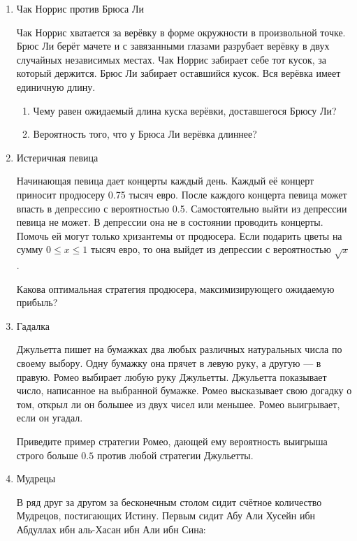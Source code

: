 \documentclass[12pt, a4paper]{article}\usepackage[]{graphicx}\usepackage[]{color}
\begin{document}
\begin{enumerate}

\item Чак Норрис против Брюса Ли

Чак Норрис хватается за верёвку в форме окружности в произвольной точке. Брюс Ли берёт мачете и с завязанными глазами разрубает верёвку в двух случайных независимых местах. Чак Норрис забирает себе тот кусок, за который держится. Брюс Ли забирает оставшийся кусок.  Вся верёвка имеет единичную длину.
\begin{enumerate}
\item Чему равен ожидаемый длина куска верёвки, доставшегося Брюсу Ли?
\item  Вероятность того, что у Брюса Ли верёвка длиннее?
\end{enumerate}

\item Истеричная певица

Начинающая певица дает концерты каждый день. Каждый её концерт приносит продюсеру 0.75 тысяч евро. После каждого концерта певица может впасть в депрессию с вероятностью 0.5. Самостоятельно выйти из депрессии певица не может. В депрессии она не в состоянии проводить концерты. Помочь ей могут только хризантемы от продюсера. Если подарить цветы на сумму $0\le x\le 1$ тысяч евро, то она выйдет из депрессии с вероятностью $\sqrt{x}$.

Какова оптимальная стратегия продюсера, максимизирующего ожидаемую прибыль?

\newpage
\item Гадалка

Джульетта пишет на бумажках два любых различных натуральных числа по своему выбору. Одну бумажку она прячет в левую руку, а другую — в правую. Ромео выбирает любую руку Джульетты. Джульетта показывает число, написанное на выбранной бумажке. Ромео высказывает свою догадку о том, открыл ли он большее из двух чисел или меньшее. Ромео выигрывает, если он угадал.

Приведите пример стратегии Ромео, дающей ему вероятность выигрыша строго больше $0.5$ против любой стратегии Джульетты.

\item Мудрецы

В ряд друг за другом за бесконечным столом сидит счётное количество Мудрецов, постигающих Истину. Первым сидит Абу Али Хусейн ибн Абдуллах ибн аль-Хасан ибн Али ибн Сина:


\end{enumerate}
\end{document}
